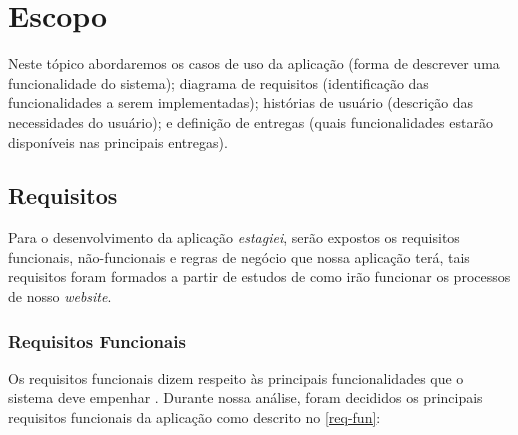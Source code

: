 \section{Escopo}

Neste tópico abordaremos os casos de uso da aplicação (forma de descrever uma funcionalidade do sistema); diagrama de requisitos (identificação das funcionalidades a serem implementadas); histórias de usuário (descrição das necessidades do usuário); e definição de entregas (quais funcionalidades estarão disponíveis nas principais entregas).
\subsection{Requisitos}

Para o desenvolvimento da aplicação \emph{estagiei}, serão expostos os requisitos funcionais, não-funcionais e regras de negócio que nossa aplicação terá, tais requisitos foram formados a partir de estudos de como irão funcionar os processos de nosso \emph{website}.

\subsubsection{Requisitos Funcionais}

Os requisitos funcionais dizem respeito às principais funcionalidades que o sistema deve empenhar \cite{sommerville}. Durante nossa análise, foram decididos os principais requisitos funcionais da aplicação como descrito no \autoref{req-fun}:


